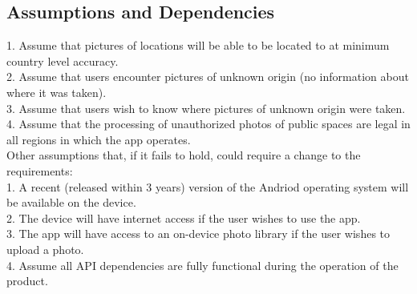 \documentclass[]{article}
\begin{document}
\subsection{Assumptions and Dependencies}
\label{sub:assumptions_and_dependencies}
1. Assume that pictures of locations will be able to be located to at minimum country level accuracy.\\
2. Assume that users encounter pictures of unknown origin (no information about where it was taken).\\
3. Assume that users wish to know where pictures of unknown origin were taken.\\
4. Assume that the processing of unauthorized photos of public spaces are legal in all regions in which the app operates. \medskip \\
Other assumptions that, if it fails to hold, could require a change to the requirements:\\
1. A recent (released within 3 years) version of the Andriod operating system will be available on the device.\\
2. The device will have internet access if the user wishes to use the app.\\
3. The app will have access to an on-device photo library if the user wishes to upload a photo.\\
4. Assume all API dependencies are fully functional during the operation of the product.
\end{document}
